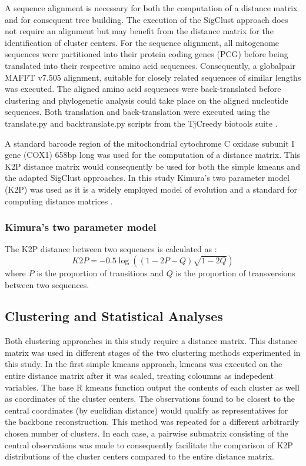 \documentclass[12pt]{article}
\begin{document}
  A sequence alignment is necessary for both the computation of a distance matrix and for consequent tree building. The execution of the SigClust approach does not require an alignment but may benefit from the distance matrix for the identification of cluster centers. For the sequence alignment, all mitogenome sequences were partitioned into their protein coding genes (PCG) before being translated into their respective amino acid sequences. Consequently, a globalpair MAFFT v7.505 \cite{MAFFT} alignment, suitable for closely related sequences of similar lengths was executed. The aligned amino acid sequences were back-translated before clustering and phylogenetic analysis could take place on the aligned nucleotide sequences. Both translation and back-translation were executed using the translate.py and backtranslate.py scripts from the TjCreedy biotools suite \cite{Tjcreedy}. 

  A standard barcode region of the mitochondrial cytochrome C oxidase subunit I gene (COX1) 658bp long \cite{Pent2016} was used for the computation of a distance matrix. This K2P distance matrix would consequently be used for both the simple kmeans and the adapted SigClust approaches. In this study Kimura’s two parameter model (K2P) was used as it is a widely employed model of evolution and a standard for computing distance matrices \cite{Collins}.

  \subsubsection{Kimura's two parameter model}
  The K2P distance between two sequences is calculated as \cite{Kimura1980}:
  \begin{equation}
    K2P = -0.5 \log((1-2P-Q)\sqrt{1-2Q})
  \end{equation}
  where $P$ is the proportion of transitions and $Q$ is the proportion of transversions between two sequences.
  
    \subsection{Clustering and Statistical Analyses}

  Both clustering approaches in this study require a distance matrix. This distance matrix was used in different stages of the two clustering methods experimented in this study. In the first simple kmeans approach, kmeans was executed on the entire distance matrix after it was scaled, treating coloumns as indepedent variables. The base R kmeans function output the contents of each cluster as well as coordinates of the cluster centers. The observations found to be closest to the central coordinates (by euclidian distance) would qualify as representatives for the backbone reconstruction. This method was repeated for a different arbitrarily chosen number of clusters. In each case, a pairwise submatrix consisting of the central observations was made to consequently facilitate the comparison of K2P distributions of the cluster centers compared to the entire distance matrix.
\end{document}
